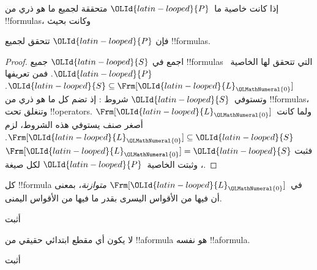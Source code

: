 \documentclass[../../../include/open-logic-section]{subfiles}
\begin{document}


\begin{thm}
  إذا كانت خاصية ما~$\OLId{latin-looped}{P}$ متحققة لجميع ما هو ذري من !!{formula}s، وكانت
  بحيث
  \begin{enumerate}
  \end{enumerate}
  فإن $\OLId{latin-looped}{P}$ تتحقق لجميع !!{formula}s.
\end{thm}

\begin{proof}
  اجمع في $\OLId{latin-looped}{S}$ جميع !!{formula}s التي تتحقق لها الخاصية~$\OLId{latin-looped}{P}$. فمن تعريفها
  $\OLId{latin-looped}{S} \subseteq \Frm[\OLId{latin-looped}{L}_\OLMathNumeral{0}]$. وتستوفي~$\OLId{latin-looped}{S}$ شروط
  : إذ تضم كل ما هو ذري من
  !!{formula}s، وتنغلق تحت !!{operator}s. ولما كانت~$\Frm[\OLId{latin-looped}{L}_\OLMathNumeral{0}]$ أصغر صنف يستوفي هذه الشروط، لزم
  $\Frm[\OLId{latin-looped}{L}_\OLMathNumeral{0}] \subseteq \OLId{latin-looped}{S}$. فثبت $\Frm[\OLId{latin-looped}{L}_\OLMathNumeral{0}] = \OLId{latin-looped}{S}$، وثبتت الخاصية~$\OLId{latin-looped}{P}$ لكل صيغة.
\end{proof}

\begin{prop}
   كل !!{formula} في~$\Frm[\OLId{latin-looped}{L}_\OLMathNumeral{0}]$ \emph{متوازنة}، بمعنى أن فيها من
   الأقواس اليسرى بقدر ما فيها من الأقواس اليمنى.
\end{prop}

\begin{prob}
أثبت 
\end{prob}

\begin{prop} 
لا يكون أي مقطع ابتدائي حقيقي من !!a{formula} هو نفسه !!a{formula}.
\end{prop}

\begin{prob}
  أثبت 
\end{prob}
\end{document}
